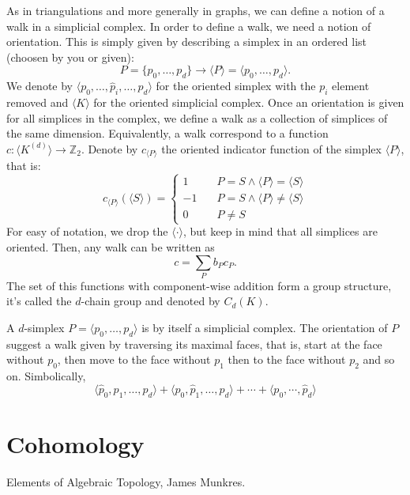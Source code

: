 \documentclass{article}
\newcommand{\Z}{\mathbb Z}
\begin{document}
As in triangulations and more generally in graphs, we can define a notion of a walk
in a simplicial complex. In order to define a walk, we need a notion of orientation.
This is simply given by describing a simplex in an ordered list (choosen by you or given):
\begin{displaymath}
  P = \lbrace p_0, \ldots, p_d \rbrace 
  \rightarrow
  \langle P \rangle = \langle p_0, \ldots, p_d \rangle.
\end{displaymath}
We denote by \(\langle p_0, \ldots, \hat p_i, \ldots, p_d \rangle\) for the oriented
simplex with the \(p_i\) element removed and \(\langle K \rangle\) for the oriented simplicial
complex. 
Once an orientation is given for all simplices
in the complex, we define a walk as a collection of simplices of the same dimension.
Equivalently, a walk correspond to a function \(c\colon \langle K^{(d)} \rangle \to \Z_2\). Denote
by \(c_{\langle P \rangle}\) the oriented indicator function of the simplex \(\langle P \rangle\), that is:
\begin{displaymath}
  c_{\langle P\rangle}(\langle S\rangle) = 
  \left\{
  \begin{aligned}
    1 &\quad P = S \land \langle P \rangle = \langle S \rangle\\
    -1 &\quad  P=S \land \langle P \rangle \ne \langle S \rangle\\
    0 &\quad P\ne S
  \end{aligned}
  \right.
\end{displaymath}
For easy of notation, we drop the \(\langle \cdot \rangle\), but keep in mind that all simplices
are oriented. Then, any walk can be written as
\begin{displaymath}
  c = \sum_{P} b_P c_{P}.
\end{displaymath}
The set of this functions with component-wise addition form a group structure, it's called
the \(d\)-chain group and denoted by \(C_d(K)\).

A \(d\)-simplex \(P=\langle p_0, \ldots, p_d \rangle\) is by itself a simplicial complex. 
The orientation of \(P\) suggest a walk given by traversing its maximal faces, that is,
start at the face without \(p_0\), then move to the face without \(p_1\) then to the face
without \(p_2\) and so on. Simbolically,
\begin{displaymath}
  \langle \hat p_0, p_1, \ldots, p_d\rangle + 
  \langle p_0, \hat p_1, \ldots, p_d\rangle 
  + \cdots +
  \langle p_0, \cdots, \hat p_d \rangle
\end{displaymath}

\section{Cohomology}

\begin{thebibliography}{9}
  Elements of Algebraic Topology, James Munkres.
\end{thebibliography}
\end{document}

